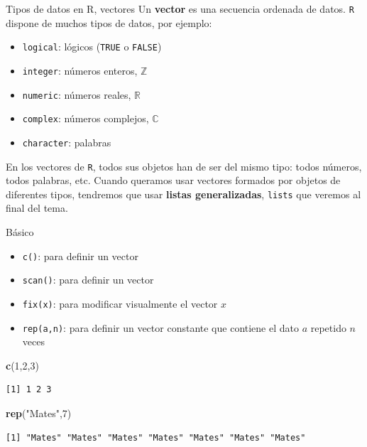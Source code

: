 \documentclass[
  ignorenonframetext,
]{beamer}
\newenvironment{Shaded}{\begin{snugshade}}{\end{snugshade}}
\newcommand{\DecValTok}[1]{\textcolor[rgb]{0.00,0.00,0.81}{#1}}
\newcommand{\FunctionTok}[1]{\textcolor[rgb]{0.13,0.29,0.53}{\textbf{#1}}}
\newcommand{\NormalTok}[1]{#1}
\newcommand{\StringTok}[1]{\textcolor[rgb]{0.31,0.60,0.02}{#1}}
\providecommand{\tightlist}{%
  \setlength{\itemsep}{0pt}\setlength{\parskip}{0pt}}
\begin{document}
\begin{frame}[fragile]{Tipos de datos en R, vectores}
\label{tipos-de-datos-en-r-vectores}
Un \textbf{vector} es una secuencia ordenada de datos. \texttt{R}
dispone de muchos tipos de datos, por ejemplo:

\begin{itemize}
\tightlist
\item
  \texttt{logical}: lógicos (\texttt{TRUE} o \texttt{FALSE})
\item
  \texttt{integer}: números enteros, \(\mathbb Z\)
\item
  \texttt{numeric}: números reales, \(\mathbb R\)
\item
  \texttt{complex}: números complejos, \(\mathbb C\)
\item
  \texttt{character}: palabras
\end{itemize}

En los vectores de \texttt{R}, todos sus objetos han de ser del mismo
tipo: todos números, todos palabras, etc. Cuando queramos usar vectores
formados por objetos de diferentes tipos, tendremos que usar
\textbf{listas generalizadas}, \texttt{lists} que veremos al final del
tema.
\end{frame}

\begin{frame}[fragile]{Básico}
\label{buxe1sico}
\begin{itemize}
\tightlist
\item
  \texttt{c()}: para definir un vector
\item
  \texttt{scan()}: para definir un vector
\item
  \texttt{fix(x)}: para modificar visualmente el vector \(x\)
\item
  \texttt{rep(a,n)}: para definir un vector constante que contiene el
  dato \(a\) repetido \(n\) veces
\end{itemize}

\begin{Shaded}
\begin{Highlighting}[]
\FunctionTok{c}\NormalTok{(}\DecValTok{1}\NormalTok{,}\DecValTok{2}\NormalTok{,}\DecValTok{3}\NormalTok{)}
\end{Highlighting}
\end{Shaded}

\begin{verbatim}
[1] 1 2 3
\end{verbatim}

\begin{Shaded}
\begin{Highlighting}[]
\FunctionTok{rep}\NormalTok{(}\StringTok{"Mates"}\NormalTok{,}\DecValTok{7}\NormalTok{)}
\end{Highlighting}
\end{Shaded}

\begin{verbatim}
[1] "Mates" "Mates" "Mates" "Mates" "Mates" "Mates" "Mates"
\end{verbatim}
\end{frame}
\end{document}
